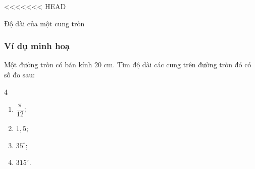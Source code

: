 <<<<<<< HEAD


\begin{dang}{Độ dài của một cung tròn}
	
\end{dang}
\subsubsection{Ví dụ minh hoạ}
\begin{vd}%
	Một đường tròn có bán kính $20$ cm. Tìm độ dài các cung trên đường tròn đó có số đo sau:
	\begin{multicols}{4}
		\begin{enumerate}
			\item $\dfrac{\pi}{12}$;
			\item $1{,}5$;
			\item $35^\circ$;
			\item $315^\circ$.
		\end{enumerate}
	\end{multicols}
\end{vd}
